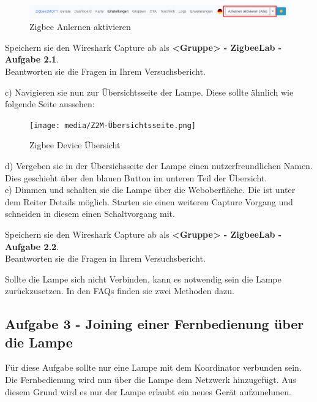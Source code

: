 \begin{figure}[H]
    \centering
    \includegraphics[width=1\textwidth]{media/Z2M-Anlernen.png}
    \caption{Zigbee Anlernen aktivieren}
\end{figure}

\begin{Aufgabe}
    Speichern sie den Wireshark Capture ab als \textbf{\grqq <Gruppe> - ZigbeeLab - Aufgabe 2.1\grqq{}}. \\
    Beantworten sie die Fragen in Ihrem Versuchsbericht.
\end{Aufgabe}

c) Navigieren sie nun zur Übersichtsseite der Lampe. Diese sollte ähnlich wie folgende Seite aussehen:

\begin{figure}[H]
    \centering
    \texttt{[image: media/Z2M-Übersichtsseite.png]}
    \caption{Zigbee Device Übersicht}
\end{figure}

d) Vergeben sie in der Übersichsseite der Lampe einen nutzerfreundlichen Namen. Dies geschieht über den blauen Button im unteren Teil der Übersicht.\\
e) Dimmen und schalten sie die Lampe über die Weboberfläche. Die ist unter dem Reiter \grqq Details\grqq{} möglich. Starten sie einen weiteren Capture Vorgang und
schneiden in diesem einen Schaltvorgang mit.

\begin{Aufgabe}
    Speichern sie den Wireshark Capture ab als \textbf{\grqq <Gruppe> - ZigbeeLab - Aufgabe 2.2\grqq{}}. \\
    Beantworten sie die Fragen in Ihrem Versuchsbericht.
\end{Aufgabe}

\begin{Hinweis}
Sollte die Lampe sich nicht Verbinden, kann es notwendig sein die Lampe zurückzusetzen. In den FAQs finden sie zwei Methoden dazu.
\end{Hinweis}

\subsection{Aufgabe 3 - Joining einer Fernbedienung über die Lampe}
Für diese Aufgabe sollte nur eine Lampe mit dem Koordinator verbunden sein. Die Fernbedienung wird nun über die Lampe dem Netzwerk hinzugefügt. Aus diesem Grund wird es nur der Lampe
erlaubt ein neues Gerät aufzunehmen. 

